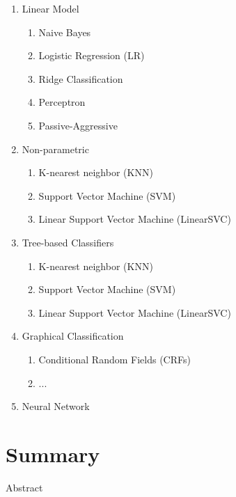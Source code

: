 \documentclass{article}
\begin{document}
\begin{enumerate}[label=4.\arabic*]
    \item Linear Model
    \begin{enumerate}[label=4.1.\arabic*]
        \item Naive Bayes
        \item Logistic Regression (LR)
        \item Ridge Classification
        \item Perceptron
        \item Passive-Aggressive
    \end{enumerate}
    
    \item Non-parametric
    \begin{enumerate}[label=4.2.\arabic*]
        \item K-nearest neighbor (KNN)
        \item Support Vector Machine (SVM)
        \item Linear Support Vector Machine (LinearSVC)
    \end{enumerate}
    
    \item Tree-based Classifiers
    \begin{enumerate}[label=4.3.\arabic*]
        \item K-nearest neighbor (KNN)
        \item Support Vector Machine (SVM)
        \item Linear Support Vector Machine (LinearSVC)
    \end{enumerate}

    \item Graphical Classification
    \begin{enumerate}[label=4.4.\arabic*]
        \item Conditional Random Fields (CRFs)
        \item ...
    \end{enumerate}

    \item Neural Network
\end{enumerate}


\section{Summary}
Abstract




\end{document}
